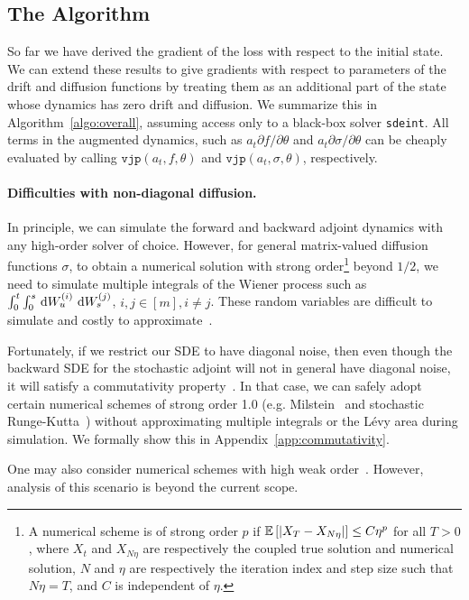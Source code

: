 \documentclass[twoside]{article}
\begin{document}
\subsection{The Algorithm}\label{subsec:the_algorithm}
So far we have derived the gradient of the loss with respect to the initial state. 
We can extend these results to give gradients with respect to parameters of the drift and diffusion functions by treating them as an additional part of the state whose dynamics has zero drift and diffusion.
We summarize this in Algorithm~\ref{algo:overall}, assuming access only to a black-box solver \texttt{sdeint}.
All terms in the augmented dynamics, such as $a_t \partial f / \partial \theta$ and $a_t \partial \sigma / \partial \theta$ can be cheaply evaluated by calling $\texttt{vjp}(a_t, f, \theta)$ and $\texttt{vjp}(a_t, \sigma, \theta)$, respectively.	

\paragraph{Difficulties with non-diagonal diffusion.}
In principle, we can simulate the forward and backward adjoint dynamics with any high-order solver of choice. However, for general matrix-valued diffusion functions $\sigma$, to obtain a numerical solution with strong order\footnote{A numerical scheme is of strong order $p$ if $\mathbb{E} \left[  | X_T - X_{N\eta} |  \right] \le C \eta^{p}$ for all $T > 0$, where $X_t$ and $X_{N\eta}$ are respectively the coupled true solution and numerical solution, $N$ and $\eta$ are respectively the iteration index and step size such that $N\eta = T$, and $C$ is independent of $\eta$.} beyond $1/2$, we need to simulate multiple integrals of the Wiener process such as $\int_0^t \int_0^s \,\mathop{\mathrm{d}\!} W_u^{(i)} \,\mathop{\mathrm{d}\!} W_s^{(j)}$, $i, j \in [m], i \ne j$.
These random variables are difficult to simulate and costly to approximate~\cite{wiktorsson2001joint}.

Fortunately, if we restrict our SDE to have diagonal noise, then even though the backward SDE for the stochastic adjoint will not in general have diagonal noise, it will satisfy a commutativity property~\cite{rossler2004runge}.
In that case, we can safely adopt certain numerical schemes of strong order 1.0 (e.g. Milstein~\cite{milstein1994numerical} and stochastic Runge-Kutta~\cite{rossler2010runge}) without approximating multiple integrals or the L\'evy area during simulation. 
We formally show this in Appendix~\ref{app:commutativity}.

One may also consider numerical schemes with high weak order~\cite{kloeden2013numerical}. 
However, analysis of this scenario is beyond the current scope.
\end{document}
